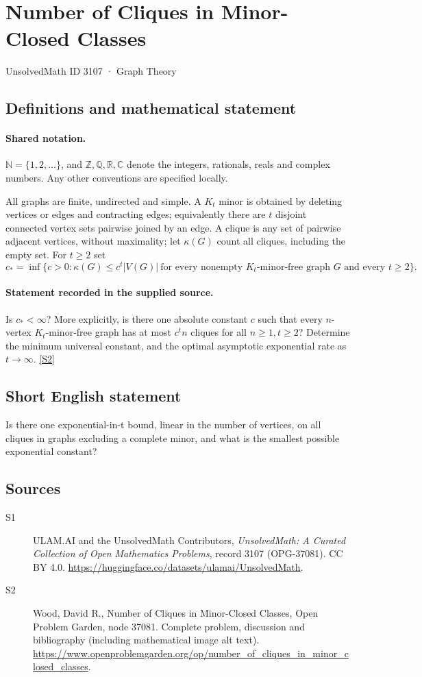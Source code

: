 \documentclass[11pt]{book}
\newcommand{\sref}[2]{\hyperlink{source:#1:#2}{[S#2]}}
\begin{document}
\setcounter{section}{3106}
\section{Number of Cliques in Minor-Closed Classes}\label{3107}
{\small\sffamily UnsolvedMath ID 3107 · Graph Theory}
\subsection{Definitions and mathematical statement}

\paragraph{Shared notation.}$\mathbb N=\{1,2,\ldots\}$, and $\mathbb Z,\mathbb Q,\mathbb R,\mathbb C$ denote the integers, rationals, reals and complex numbers. Any other conventions are specified locally.


All graphs are finite, undirected and simple. A $K_t$ minor is obtained by deleting vertices or edges and contracting edges; equivalently there are $t$ disjoint connected vertex sets pairwise joined by an edge. A clique is any set of pairwise adjacent vertices, without maximality; let $\kappa(G)$ count all cliques, including the empty set. For $t\geq2$ set
\[c_* =\inf\bigl\{c>0:\kappa(G)\leq c^t|V(G)|\ \text{for every nonempty }K_t\text{-minor-free graph }G\text{ and every }t\geq2\bigr\}.\]
\paragraph{Statement recorded in the supplied source.}
Is $c_*<\infty$? More explicitly, is there one absolute constant $c$ such that every $n$-vertex $K_t$-minor-free graph has at most $c^t n$ cliques for all $n\geq1,t\geq2$? Determine the minimum universal constant, and the optimal asymptotic exponential rate as $t\to\infty$. \sref{3107}{2}
\subsection{Short English statement}
Is there one exponential-in-t bound, linear in the number of vertices, on all cliques in graphs excluding a complete minor, and what is the smallest possible exponential constant?
\subsection{Sources}
\begin{description}
\item[\hypertarget{source:3107:1}{S1}] ULAM.AI and the UnsolvedMath Contributors, \emph{UnsolvedMath: A Curated Collection of Open Mathematics Problems}, record 3107 (OPG-37081). CC BY 4.0. \url{https://huggingface.co/datasets/ulamai/UnsolvedMath}.
\item[\hypertarget{source:3107:2}{S2}] Wood, David R., Number of Cliques in Minor-Closed Classes, Open Problem Garden, node 37081. Complete problem, discussion and bibliography (including mathematical image alt text). \url{https://www.openproblemgarden.org/op/number_of_cliques_in_minor_closed_classes}.
\end{description}
\label{end:3107}
\end{document}
